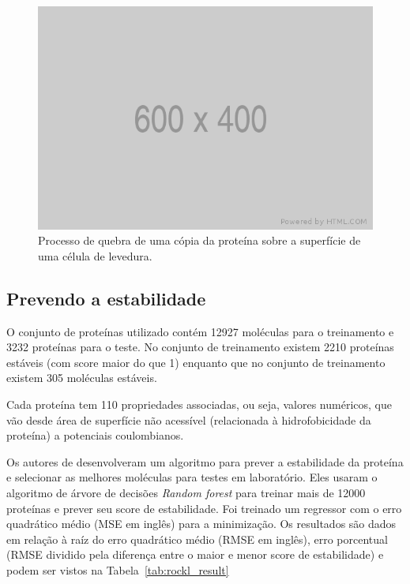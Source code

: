 \begin{figure}
    \centering
    \includegraphics[width=1.0\textwidth]{images/placeholder.png}
    \caption{Processo de quebra de uma cópia da proteína sobre a superfície de uma 
            célula de levedura.}
    \label{fig:yeast_cell}
    \fautor
\end{figure}

\subsection{Prevendo a estabilidade}
O conjunto de proteínas utilizado contém 12927 moléculas para o treinamento e 
3232 proteínas para o teste. No conjunto de treinamento existem 2210 proteínas 
estáveis (com score maior do que 1) enquanto que no conjunto de treinamento 
existem 305 moléculas estáveis. 

Cada proteína tem 110 propriedades associadas, ou seja, valores numéricos,
que vão desde área de superfície não acessível (relacionada à hidrofobicidade
da proteína) a potenciais coulombianos.  

Os autores de \cite{Rocklin2017} desenvolveram um algoritmo para prever a estabilidade
da proteína e selecionar as melhores moléculas para testes em laboratório. Eles usaram 
o algoritmo de árvore de decisões \textit{Random forest} para treinar mais de 12000
proteínas e prever seu score de estabilidade. Foi treinado um regressor com o erro quadrático
médio (MSE em inglês) para a minimização. Os resultados são dados em relação à raíz do erro quadrático
médio (RMSE em inglês), erro porcentual (RMSE dividido pela diferença entre o maior e menor score
de estabilidade) e podem ser vistos na Tabela~\ref{tab:rockl_result}

